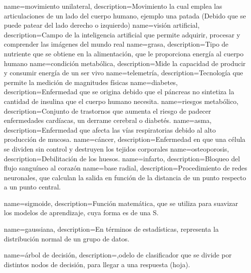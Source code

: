 {
 name={movimiento unilateral},
 description={Movimiento la cual emplea las articulaciones de un lado del cuerpo humano, ejemplo una patada (Debido que se puede patear del lado derecho o izquierdo)}
 }
 {
 name={visi\'on artificial},
 description={Campo de la  inteligencia artificial que permite adquirir, procesar y comprender las im\'agenes del mundo real}
 }
 {
 name={grasa},
 description={Tipo de nutriente que se obtiene en la alimentaci\'on, que le proporciona energ\'ia al cuerpo humano}
 }
 {
 name={condici\'on metab\'olica},
 description={Mide la capacidad de producir y consumir energ\'ia de un ser vivo}
 }
 {
 name={telemetr\'ia},
 description={Tecnolog\'ia que permite la medici\'on de magnitudes f\'isicas}
 }
 {
 name={diabetes},
 description={Enfermedad que se origina debido que el p\'ancreas no sintetiza la cantidad de insulina que el cuerpo humano necesita.}
 }
 {
 name={riesgos metab\'olico},
 description={Conjunto de trastornos que aumenta el riesgo de padecer enfermedades card\'iacas, un derrame cerebral o diabet\'es.}
 }
 {
 name={asma},
 description={Enfermedad que afecta las v\'ias respiratorias debido al alto producci\'on de mucosa.}
 }
 {
 name={c\'ancer},
 description={Enfermedad en que una c\'elula se dividen sin control y destruyen los tejidos corporales}
 }
 {
 name={osteoporosis},
 description={Debilitaci\'on de los huesos. }
 }
 {
 name={infarto},
 description={Bloqueo del flujo sangu\'ineo al coraz\'on}
 }
 {
 name={base radial},
 description={Procedimiento de redes neuronales, que calculan la salida en funci\'on de la distancia de un punto respecto a un punto central. }
 }
 
 {
 name={sigmoide},
 description={Funci\'on matem\'atica, que se utiliza para suavizar los modelos de aprendizaje, cuya forma es de una S. }
 }
 
 {
 name={gaussiana},
 description={En t\'erminos de estad\'isticas, representa la distribuci\'on normal de un grupo de datos.}
 }
 
 {
 name={\'arbol de decisi\'on},
 description={,odelo de clasificador que se divide por distintos nodos de decisi\'on, para llegar a una respuesta (hoja).}
 }
 
